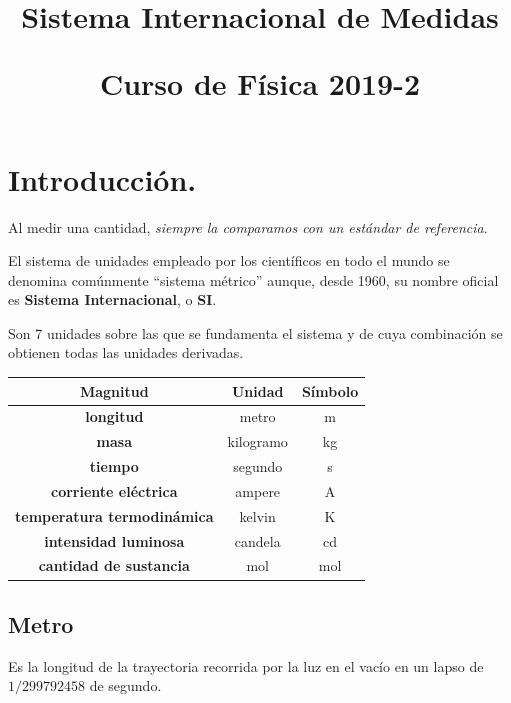 
\usepackage[sfdefault]{roboto}  %
\usepackage[T1]{fontenc}
\title{Sistema Internacional de Medidas \\ \begin{Large}Curso de Física 2019-2\end{Large}}
\setlength{\voffset}{-1cm}

\maketitle
\vspace*{-2cm} 
\fontsize{14}{14}\selectfont
\section{Introducción.}
Al medir una cantidad, \emph{siempre la comparamos con un estándar de referencia}.
\par
El sistema de unidades empleado por los científicos en todo el mundo se denomina comúnmente \enquote{sistema métrico} aunque, desde 1960, su nombre oficial es \textbf{Sistema Internacional}, o \textbf{SI}.
\par
Son 7 unidades sobre las que se fundamenta el sistema y de cuya combinación se obtienen todas las unidades derivadas.
\par
\begin{center}
\begin{tabular}{ | c | c | c |}
\hline
Magnitud                            & Unidad    & Símbolo \\ \hline
\textbf{longitud}                   & metro     & m        \\ \hline
\textbf{masa}                       & kilogramo & kg       \\ \hline
\textbf{tiempo}                     & segundo   & s        \\ \hline
\textbf{corriente eléctrica}       & ampere    & A        \\ \hline
\textbf{temperatura termodinámica} & kelvin    & K        \\ \hline
\textbf{intensidad luminosa}        & candela   & cd       \\ \hline
\textbf{cantidad de sustancia}      & mol       & mol      \\ \hline
\end{tabular}
\end{center}
\subsection{Metro}
Es la longitud de la trayectoria recorrida por la luz en el vacío en un lapso de $1/299 792 458$ de segundo.
